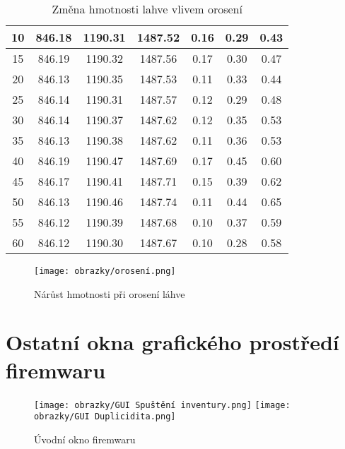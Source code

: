 \begin{table}[H]
\begin{tabular}{|c|c|c|c||c|c|c|}
    10 & 846.18 & 1190.31 & 1487.52 & 0.16 & 0.29 & 0.43 \\ \hline
    15 & 846.19 & 1190.32 & 1487.56 & 0.17 & 0.30 & 0.47 \\ \hline
    20 & 846.13 & 1190.35 & 1487.53 & 0.11 & 0.33 & 0.44 \\ \hline
    25 & 846.14 & 1190.31 & 1487.57 & 0.12 & 0.29 & 0.48 \\ \hline
    30 & 846.14 & 1190.37 & 1487.62 & 0.12 & 0.35 & 0.53 \\ \hline
    35 & 846.13 & 1190.38 & 1487.62 & 0.11 & 0.36 & 0.53 \\ \hline
    40 & 846.19 & 1190.47 & 1487.69 & 0.17 & 0.45 & 0.60 \\ \hline
    45 & 846.17 & 1190.41 & 1487.71 & 0.15 & 0.39 & 0.62 \\ \hline
    50 & 846.13 & 1190.46 & 1487.74 & 0.11 & 0.44 & 0.65 \\ \hline
    55 & 846.12 & 1190.39 & 1487.68 & 0.10 & 0.37 & 0.59 \\ \hline
    60 & 846.12 & 1190.30 & 1487.67 & 0.10 & 0.28 & 0.58 \\ \hline
    \end{tabular}
    \caption{Změna hmotnosti lahve vlivem orosení}
    \label{tab:measurement_data}
\end{table}

\begin{figure}[H]
    \begin{center}
        \texttt{[image: obrazky/orosení.png]}
    \end{center}
    \caption{Nárůst hmotnosti při orosení láhve}
\end{figure}

\chapter{Ostatní okna grafického prostředí firemwaru}

\begin{figure}[!h]
    \begin{center}
        \texttt{[image: obrazky/GUI Spuštění inventury.png]}
        \texttt{[image: obrazky/GUI Duplicidita.png]}  
    \end{center}
    \caption{Úvodní okno firemwaru}
    \label{Úvodní okno aplikace}
\end{figure}


